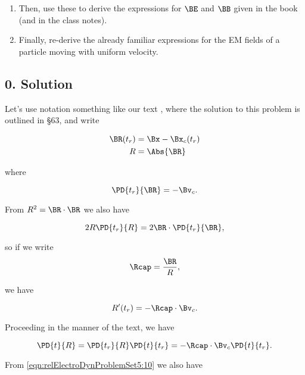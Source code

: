 \begin{enumerate}
\item Then, use these to derive the expressions for $\BE$ and $\BB$ given in the book (and in the class notes).
\item Finally, re-derive the already familiar expressions for the EM fields of a particle moving with uniform velocity.
\end{enumerate}

\subsection{0. Solution}

Let's use notation something like our text \cite{landau1980classical}, where the solution to this problem is outlined in \S 63, and write

\begin{align}\label{eqn:relElectroDynProblemSet5:70}
\BR(t_r) &= \Bx - \Bx_c(t_r) \\
R &= \Abs{\BR}
\end{align}

where

\begin{equation}\label{eqn:relElectroDynProblemSet5:90}
\PD{t_r}{\BR} = - \Bv_c.
\end{equation}

From $R^2 = \BR \cdot \BR$ we also have

\begin{equation}\label{eqn:relElectroDynProblemSet5:110}
2 R \PD{t_r}{R} = 2 \BR \cdot \PD{t_r}{\BR},
\end{equation}

so if we write
\begin{equation}\label{eqn:relElectroDynProblemSet5:130}
\Rcap = \frac{\BR}{R},
\end{equation}

we have

\begin{equation}\label{eqn:relElectroDynProblemSet5:150}
R'(t_r) = -\Rcap \cdot \Bv_c.
\end{equation}

Proceeding in the manner of the text, we have

\begin{equation}\label{eqn:relElectroDynProblemSet5:170}
\PD{t}{R} = \PD{t_r}{R} \PD{t}{t_r} = -\Rcap \cdot \Bv_c \PD{t}{t_r}.
\end{equation}

From \ref{eqn:relElectroDynProblemSet5:10} we also have

